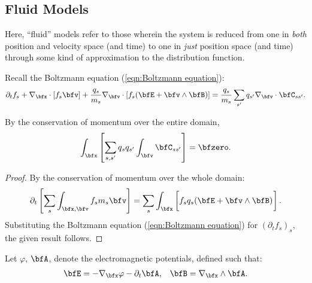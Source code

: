 \subsection*{Fluid Models}\label{cha:fluid models}
    \line

    \begin{definition}
        Here, ``fluid'' models refer to those wherein the system is reduced from one in \emph{both} position and velocity space (and time) to one in \emph{just} position space (and time) through some kind of approximation to the distribution function.
    \end{definition}

    \line
    
    Recall the Boltzmann equation (\ref{eqn:Boltzmann equation}):
    \begin{equation*}
        \partial_{t}f_{s} + \nabla_{\bfx}\cdot[f_{s}\bfv] + \frac{q_{s}}{m_{s}}\nabla_{\bfv}\cdot[f_{s}(\bfE + \bfv\wedge\bfB)]  =  \frac{q_{s}}{m_{s}}\sum_{s'}q_{s'}\nabla_{\bfv}\cdot\bfC_{ss'}.
    \end{equation*}

    \begin{lemma}
        By the conservation of momentum over the entire domain,
        \begin{equation}
            \int_{\bfx}\left[\sum_{s, s'}q_{s}q_{s'}\int_{\bfv}\bfC_{ss'}\right]  =  \bfzero.
        \end{equation}
    \end{lemma}
    \begin{proof}
        By the conservation of momentum over the whole domain:
        \begin{equation}
            \partial_{t}\left[\sum_{s}\int_{\bfx, \bfv}f_{s}m_{s}\bfv\right]  =  \sum_{s}\int_{\bfx}\left[f_{s}q_{s}(\bfE + \bfv\wedge\bfB)\tall\right].
        \end{equation}
        Substituting the Boltzmann equation (\ref{eqn:Boltzmann equation}) for $(\partial_{t}f_{s})_{s}$, the given result follows.
    \end{proof}

    Let $\varphi$, $\bfA$, denote the electromagnetic potentials, defined such that:
    \begin{align}
        \bfE  =  - \nabla_{\bfx}\varphi - \partial_{t}\bfA,  &&
        \bfB  =  \nabla_{\bfx}\wedge\bfA.
    \end{align}
    

